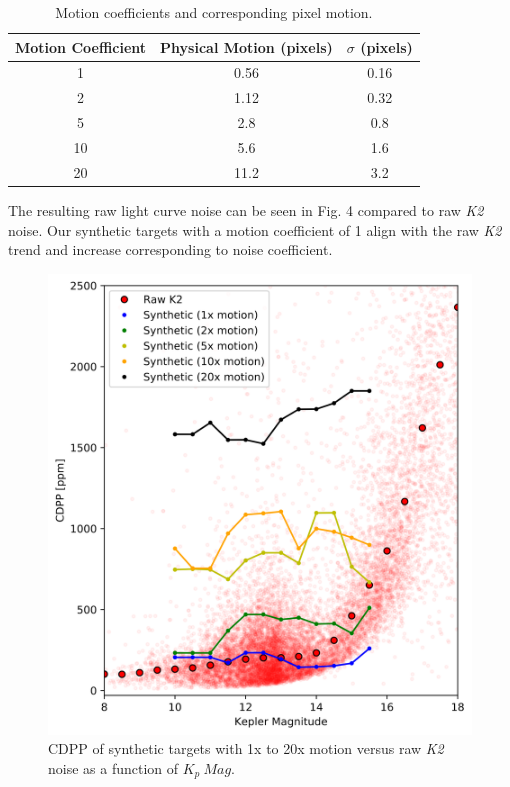 \documentclass[12pt,preprint]{emulateapj}
\begin{document}
\begin{table}[h!]
\begin{center}
    \begin{tabular}{c | c | c}
        Motion Coefficient & Physical Motion (pixels) & $\sigma$ (pixels) \\
        \hline \hline
        1 & 0.56 & 0.16 \\
        2 & 1.12 & 0.32 \\
				5 & 2.8 & 0.8 \\
				10 & 5.6 & 1.6 \\
				20 & 11.2 & 3.2 \\
   \end{tabular}
	 \caption{Motion coefficients and corresponding pixel motion.}
	 \label{table:1}
\end{center}
\end{table}

The resulting raw light curve noise can be seen in Fig. 4 compared to raw \textit{K2} noise. Our synthetic targets with a motion coefficient of 1 align with the raw \textit{K2} trend and increase corresponding to noise coefficient.

\begin{figure}[h]
	\centering
	\includegraphics[width=1.0\linewidth]{rawmotion.png}
	\caption{CDPP of synthetic targets with 1x to 20x motion versus raw \textit{K2} noise as a function of $K_p\ Mag$.}
	\label{fig:rawmotion}
\end{figure}
\end{document}

